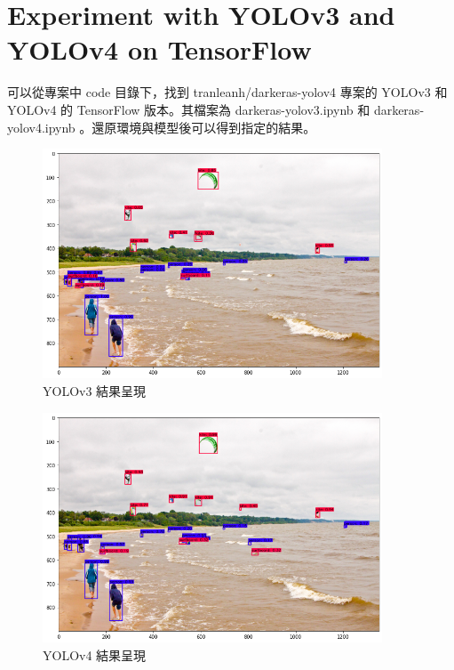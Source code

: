 \documentclass[10pt,UTF8]{ctexart}
\begin{document}
\newpage

\section{Experiment with YOLOv3 and YOLOv4 on TensorFlow}

可以從專案中 code 目錄下，找到 tranleanh/darkeras-yolov4 專案的 YOLOv3 和 YOLOv4 的 TensorFlow 版本。其檔案為 darkeras-yolov3.ipynb 和 darkeras-yolov4.ipynb 。還原環境與模型後可以得到指定的結果。

\begin{figure}[H]
\centering 
\includegraphics[width=0.90\textwidth]{dyolo3.png} 
\caption{YOLOv3 結果呈現}
\label{Test}
\end{figure}

\begin{figure}[H]
\centering 
\includegraphics[width=0.90\textwidth]{dyolo4.png} 
\caption{YOLOv4 結果呈現}
\label{Test}
\end{figure}
\end{document}
